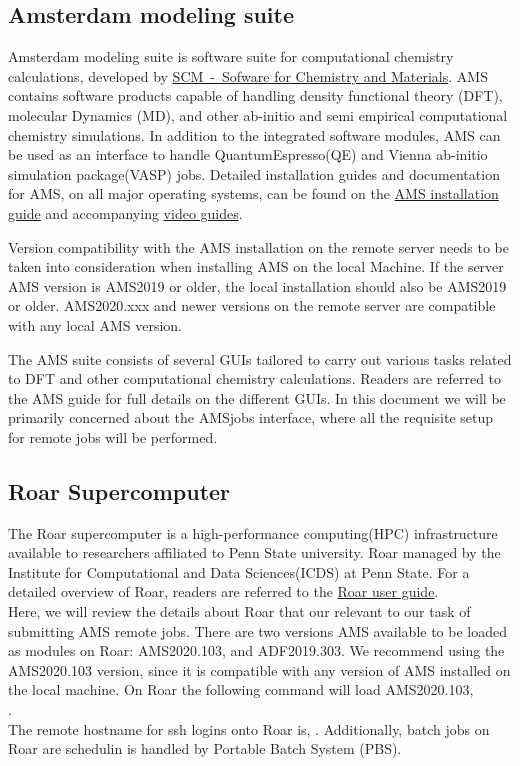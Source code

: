 \subsection*{Amsterdam modeling suite}
Amsterdam modeling suite is software suite for computational chemistry calculations, developed by \href{https://www.scm.com/}{SCM~-~Sofware for Chemistry and Materials}. 
AMS contains software products capable of handling density functional theory (DFT), molecular Dynamics (MD), and other ab-initio and semi empirical computational chemistry simulations. 
In addition to the integrated software modules, AMS can be used as an interface to handle QuantumEspresso(QE) and Vienna ab-initio simulation package(VASP) jobs. 
Detailed installation guides and documentation for AMS, on all major operating systems, can be found on the \href{https://www.scm.com/doc/Installation/index.html}{AMS installation guide} and accompanying \href{https://www.scm.com/support/ams-installation-videos/}{video guides}. 
\begin{tcolorbox}[colback=pantone!10!white,colframe=pantone,title=\textit{Note:}]
    Version compatibility with the AMS installation on the remote server needs to be taken into consideration when installing AMS on the local Machine. 
    If the server AMS version is AMS2019 or older, the local installation should also be AMS2019 or older. 
    AMS2020.xxx and newer versions on the remote server are compatible with any local AMS version.
\end{tcolorbox}
\noindent The AMS suite consists of several GUIs tailored to carry out various tasks related to DFT and other computational chemistry calculations. Readers are referred to the AMS guide for full details on the different GUIs. In this document we will be primarily concerned about the AMSjobs interface, where all the requisite setup for remote jobs will be performed.
\subsection*{Roar Supercomputer}
The Roar supercomputer is a high-performance computing(HPC) infrastructure available to researchers affiliated to Penn State university. 
Roar managed by the Institute for Computational and Data Sciences(ICDS) at Penn State. 
For a detailed overview of Roar, readers are referred to the \href{https://www.icds.psu.edu/computing-services/roar-user-guide/}{Roar user guide}. \\

Here, we will review the details about Roar that our relevant to our task of submitting AMS remote jobs. 
There are two versions AMS available to be loaded as modules on Roar: AMS2020.103, and ADF2019.303. 
We recommend using the AMS2020.103 version, since it is compatible with any version of AMS installed on the local machine. 
On Roar the following command will load AMS2020.103, \\
.\\

The remote hostname for ssh logins onto Roar is, . Additionally, batch jobs on Roar are schedulin is handled by Portable Batch System (PBS).
